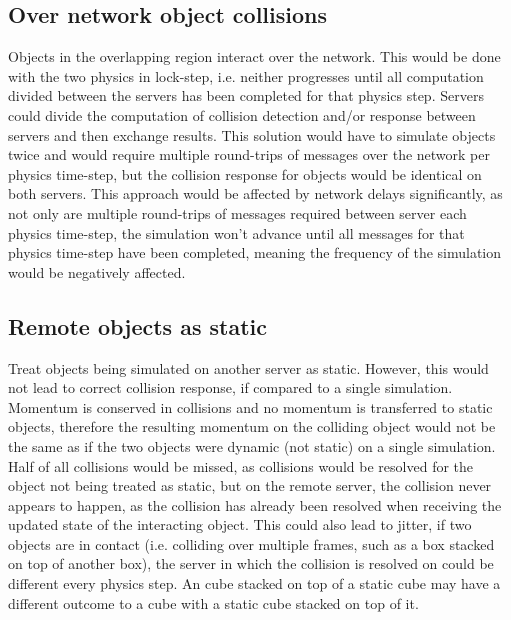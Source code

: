 \subsection{Over network object collisions}
Objects in the overlapping region interact over the network. This would be done with the two physics in lock-step, i.e. neither progresses until all computation divided between the servers has been completed for that physics step. Servers could divide the computation of collision detection and/or response between servers and then exchange results. This solution would have to simulate objects twice and would require multiple round-trips of messages over the network per physics time-step, but the collision response for objects would be identical on both servers. This approach would be affected by network delays significantly, as not only are multiple round-trips of messages required between server each physics time-step, the simulation won't advance until all messages for that physics time-step have been completed, meaning the frequency of the simulation would be negatively affected.


\subsection{Remote objects as static}
Treat objects being simulated on another server as static. However, this would not lead to correct collision response, if compared to a single simulation. Momentum is conserved in collisions and no momentum is transferred to static objects, therefore the resulting momentum on the colliding object would not be the same as if the two objects were dynamic (not static) on a single simulation.
Half of all collisions would be missed, as collisions would be resolved for the object not being treated as static, but on the remote server, the collision never appears to happen, as the collision has already been resolved when receiving the updated state of the interacting object.
This could also lead to jitter, if two objects are in contact (i.e. colliding over multiple frames, such as a box stacked on top of another box), the server in which the collision is resolved on could be different every physics step. An cube stacked on top of a static cube may have a different outcome to a cube with a static cube stacked on top of it.


